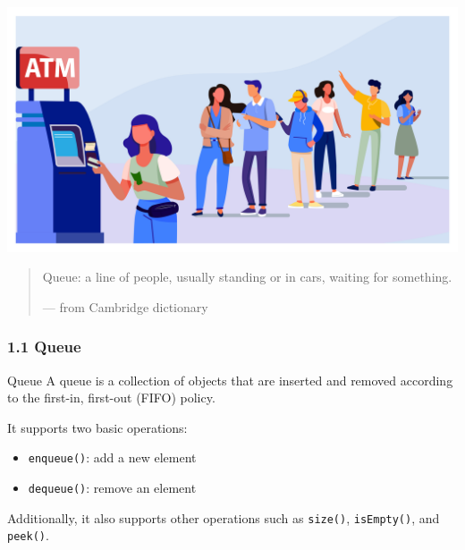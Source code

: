 \documentclass[aspectratio=169, 14pt]{beamer}
\begin{document}
\begin{frame}

   \begin{center}
    \includegraphics[height=.5\paperheight]{week4/atm}
   \end{center} 
   \begin{quote}
    Queue: a line of people, usually standing or in cars, waiting for something.
    \begin{flushright}
        --- from Cambridge dictionary
    \end{flushright}
\end{quote}
\end{frame}

\begin{frame}
    \frametitle{1.1 Queue}

    \begin{exampleblock}{Queue}
        A queue is a collection of objects that are inserted and removed according to the 
        \alert{first-in, first-out (FIFO)} policy.        
    \end{exampleblock}
    \pause
    It supports two basic operations:
    \begin{itemize}
        \item \texttt{enqueue()}: add a new element
        \item \texttt{dequeue()}: remove an element
    \end{itemize}
    Additionally, it also supports other operations such as \texttt{size()}, \texttt{isEmpty()}, and \texttt{peek()}.
\end{frame}
\end{document}
